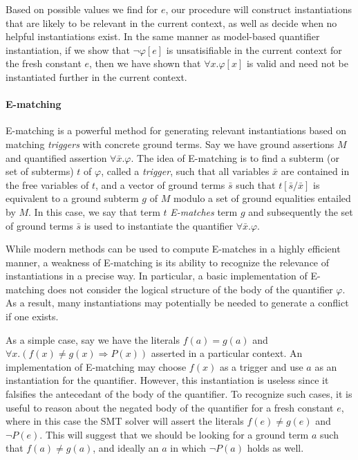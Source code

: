 \documentclass{llncs}
\begin{document}
Based on possible values we find for $e$, our procedure will construct instantiations that are likely to be relevant in the current context, as well as decide when no helpful instantiations exist.
In the same manner as model-based quantifier instantiation, if we show that $\neg \varphi[e]$ is unsatisifiable in the current context for the fresh constant $e$, then we have shown that $\forall x. \varphi[x]$ is valid and need not be instantiated further in the current context.

\paragraph{E-matching}
E-matching is a powerful method for generating relevant instantiations based on matching \emph{triggers} with concrete ground terms. 
Say we have ground assertions $M$ and quantified assertion $\forall \bar{x}. \varphi$.
The idea of E-matching is to find a subterm (or set of subterms) $t$ of $\varphi$, called a \emph{trigger}, such that all variables $\bar{x}$ are contained in the free variables of $t$, and a vector of ground terms $\bar{s}$ such that $t[\bar{s}/\bar{x}]$ is equivalent to a ground subterm $g$ of $M$ modulo a set of ground equalities entailed by $M$.
In this case, we say that term $t$ \emph{E-matches} term $g$ and subsequently the set of ground terms $\bar{s}$ is used to instantiate the quantifier $\forall \bar{x}. \varphi$.

While modern methods can be used to compute E-matches in a highly efficient manner, a weakness of E-matching is its ability to recognize the relevance of instantiations in a precise way.
In particular, a basic implementation of E-matching does not consider the logical structure of the body of the quantifier $\varphi$.
As a result, many instantiations may potentially be needed to generate a conflict if one exists.

As a simple case, say we have the literals $f( a ) = g( a )$ and $\forall x. ( f(x) \neq g(x) \Rightarrow P( x ) )$ asserted in a particular context. 
An implementation of E-matching may choose $f( x )$ as a trigger and use $a$ as an instantiation for the quantifier.
However, this instantiation is useless since it falsifies the antecedant of the body of the quantifier.
To recognize such cases, it is useful to reason about the negated body of the quantifier for a fresh constant $e$, where in this case the SMT solver will assert the literals $f( e ) \neq g( e )$ and $\neg P( e )$.
This will suggest that we should be looking for a ground term $a$ such that $f( a ) \neq g( a )$, and ideally an $a$ in which $\neg P( a )$ holds as well.
\end{document}
